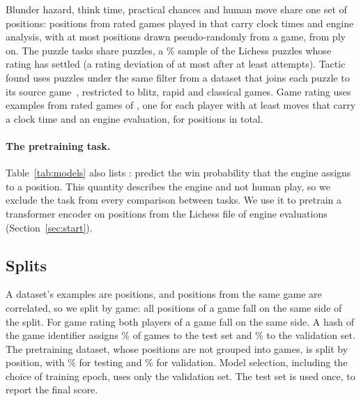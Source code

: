 \documentclass[11pt]{article}
\begin{document}
Blunder hazard, think time, practical chances and human move share one set of
positions:  positions from
 rated  games
played in  that carry clock times and engine
analysis, with at most  positions drawn
pseudo-randomly from a game, from ply  on.
The puzzle tasks share  puzzles, a
\% sample of the Lichess puzzles
whose rating has settled (a rating deviation of at most
 after at least
 attempts). Tactic found uses
 puzzles under the same filter from a dataset that
joins each puzzle to its source game~\cite{puzzlegames}, restricted to
blitz, rapid and classical games. Game rating uses  examples
from  rated  games
of , one for each player with at least
 moves that carry a clock time and an
engine evaluation, for  positions in total.

\paragraph{The pretraining task.}
Table~\ref{tab:models} also lists : predict the win
probability that the engine assigns to a position. This quantity describes
the engine and not human play, so we exclude the task from every comparison
between tasks. We use it to pretrain a transformer encoder on
 positions from the Lichess file of
engine evaluations~\cite{lichessdb} (Section~\ref{sec:start}).

\subsection{Splits}

A dataset's examples are positions, and positions from the same game are
correlated, so we split by game: all positions of a game fall on the same
side of the split. For game rating both players of a game fall on the same
side. A hash of the game identifier assigns \% of
games to the test set and \% to the validation
set. The pretraining dataset, whose positions are not grouped into games, is
split by position, with \% for testing and
\% for validation. Model selection,
including the choice of training epoch, uses only the validation set. The
test set is used once, to report the final score.
\end{document}
